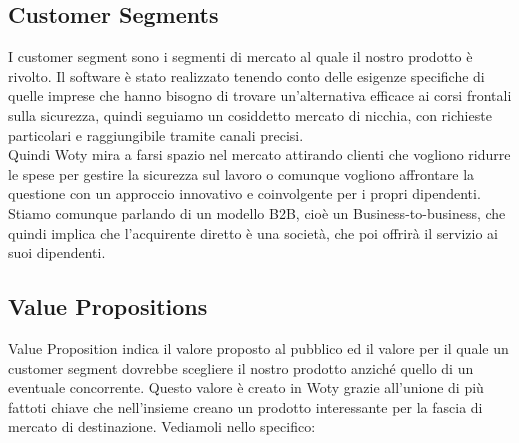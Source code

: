 \subsection{Customer Segments}
I customer segment sono i segmenti di mercato al quale il nostro prodotto è rivolto. Il software è stato realizzato tenendo conto delle esigenze specifiche di quelle imprese che hanno bisogno di trovare un'alternativa efficace ai corsi frontali sulla sicurezza, quindi seguiamo un cosiddetto mercato di nicchia, con richieste particolari e raggiungibile tramite canali precisi. \\
Quindi Woty mira a farsi spazio nel mercato attirando clienti che vogliono ridurre le spese per gestire la sicurezza sul lavoro o comunque vogliono affrontare la questione con un approccio innovativo e coinvolgente per i propri dipendenti. \\
Stiamo comunque parlando di un modello B2B, cioè un Business-to-business, che quindi implica che l'acquirente diretto è una società, che poi offrirà il servizio ai suoi dipendenti.\\

\subsection{Value Propositions}
Value Proposition indica il valore proposto al pubblico ed il valore per il quale un customer segment dovrebbe scegliere il nostro prodotto anziché quello di un eventuale concorrente. Questo valore è creato in Woty grazie all'unione di più fattoti chiave che nell'insieme creano un prodotto interessante per la fascia di mercato di destinazione. Vediamoli nello specifico:

